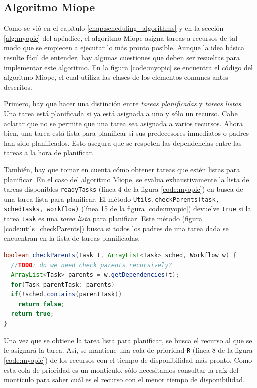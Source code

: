 \subsection{Algoritmo Miope}
Como se vió en el capítulo \ref{chap:scheduling_algorithms} y en la sección \ref{alg:myopic} del apéndice, el algoritmo Miope asigna tareas a recursos de tal modo que se empiecen a ejecutar lo más pronto posible. Aunque la idea básica resulte fácil de entender, hay algunas cuestiones que deben ser resueltas para implementar este algoritmo. En la figura \ref{code:myopic} se encuentra el código del algoritmo Miope, el cual utiliza las clases de los elementos comunes antes descritos. 

Primero, hay que hacer una distinción entre \emph{tareas planificadas} y \emph{tareas listas}. Una tarea está planificada si ya está asignada a uno y sólo un recurso. Cabe aclarar que no se permite que una tarea sea asignada a varios recursos. Ahora bien, una tarea está lista para planificar si sus predecesores inmediatos o padres han sido planificados. Esto asegura que se respeten las dependencias entre las tareas a la hora de planificar.

También, hay que tomar en cuenta cómo obtener tareas que estén listas para planificar. En el caso del algoritmo Miope, se evalua exhaustivamente la lista de tareas disponibles \texttt{readyTasks} (línea 4 de la figura \ref{code:myopic}) en busca de una tarea lista para planificar. El método \texttt{Utils.checkParents(task, schedTasks, workflow)} (línea 15 de la figura \ref{code:myopic}) devuelve \texttt{true} si la tarea \texttt{task} es una \emph{tarea lista} para planificar. Este método (figura \ref{code:utils_checkParents}) busca si todos los padres de una tarea dada se encuentran en la lista de tareas planificadas.

\begin{lstlisting}[language=java,label={code:utils_checkParents},caption={Método que verifica si los padres de una tarea están planificados.},float]
boolean checkParents(Task t, ArrayList<Task> sched, Workflow w) {
  //TODO: do we need check parents recursively?
  ArrayList<Task> parents = w.getDependencies(t);
  for(Task parentTask: parents)
  if(!sched.contains(parentTask))
    return false;
  return true;
}
\end{lstlisting}

Una vez que se obtiene la tarea lista para planificar, se busca el recurso al que se le asignará la tarea. Así, se mantiene una cola de prioridad \texttt{R} (línea 8 de la figura \ref{code:myopic}) de los recursos con el tiempo de disponibilidad más pronto. Como esta cola de prioridad es un montículo, sólo necesitamos consultar la raíz del montículo para saber cuál es el recurso con el menor tiempo de disponibilidad. 

